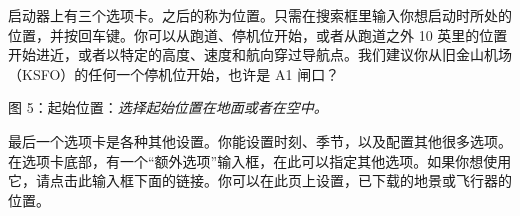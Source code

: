 启动器上有三个选项卡。之后的称为位置。只需在搜索框里输入你想启动时所处的位置，并按回车键。你可以从跑道、停机位开始，或者从跑道之外 10 英里的位置开始进近，或者以特定的高度、速度和航向穿过导航点。我们建议你从旧金山机场（KSFO）的任何一个停机位开始，也许是 A1 闸口？
\medskip
\centerline{}
\smallskip
\noindent
图 5：起始位置：\textit{选择起始位置在地面或者在空中。}
\medskip

最后一个选项卡是各种其他设置。你能设置时刻、季节，以及配置其他很多选项。在选项卡底部，有一个“额外选项”输入框，在此可以指定其他选项。如果你想使用它，请点击此输入框下面的链接。你可以在此页上设置，已下载的地景或飞行器的位置。
\medskip

